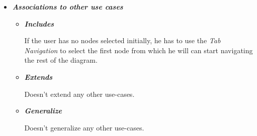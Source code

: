 \begin{itemize}
\begin{itemize}
\end{itemize}

\item {\bf \em Associations to other use cases}

\begin{itemize}

\item {\bf \em Includes}
\par \noindent
If the user has no nodes selected initially, he has to use the {\em Tab Navigation} to select the first node from which he will can start navigating the rest of the diagram.

\item {\bf \em Extends}
\par \noindent
Doesn't extend any other use-cases.

\item {\bf \em Generalize}
\par \noindent
Doesn't generalize any other use-cases.

\end{itemize}

\end{itemize}

